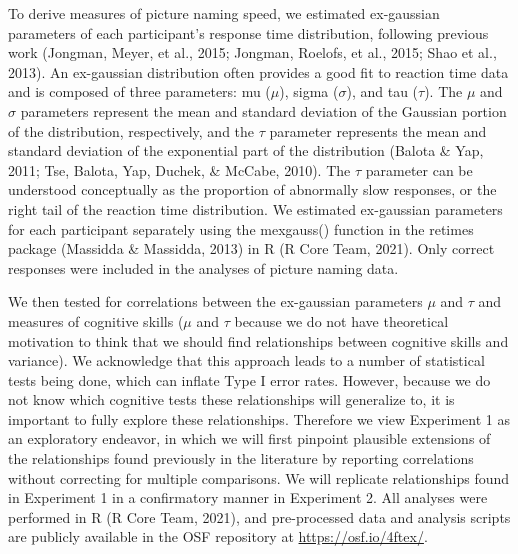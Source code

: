 \documentclass[
  man,floatsintext]{apa6}
\begin{document}
To derive measures of picture naming speed, we estimated ex-gaussian parameters of each participant's response time distribution, following previous work (Jongman, Meyer, et al., 2015; Jongman, Roelofs, et al., 2015; Shao et al., 2013). An ex-gaussian distribution often provides a good fit to reaction time data and is composed of three parameters: mu (\(\mu\)), sigma (\(\sigma\)), and tau (\(\tau\)). The \(\mu\) and \(\sigma\) parameters represent the mean and standard deviation of the Gaussian portion of the distribution, respectively, and the \(\tau\) parameter represents the mean and standard deviation of the exponential part of the distribution (Balota \& Yap, 2011; Tse, Balota, Yap, Duchek, \& McCabe, 2010). The \(\tau\) parameter can be understood conceptually as the proportion of abnormally slow responses, or the right tail of the reaction time distribution. We estimated ex-gaussian parameters for each participant separately using the mexgauss() function in the retimes package (Massidda \& Massidda, 2013) in R (R Core Team, 2021). Only correct responses were included in the analyses of picture naming data.

We then tested for correlations between the ex-gaussian parameters \(\mu\) and \(\tau\) and measures of cognitive skills (\(\mu\) and \(\tau\) because we do not have theoretical motivation to think that we should find relationships between cognitive skills and variance). We acknowledge that this approach leads to a number of statistical tests being done, which can inflate Type I error rates. However, because we do not know which cognitive tests these relationships will generalize to, it is important to fully explore these relationships. Therefore we view Experiment 1 as an exploratory endeavor, in which we will first pinpoint plausible extensions of the relationships found previously in the literature by reporting correlations without correcting for multiple comparisons. We will replicate relationships found in Experiment 1 in a confirmatory manner in Experiment 2. All analyses were performed in R (R Core Team, 2021), and pre-processed data and analysis scripts are publicly available in the OSF repository at \url{https://osf.io/4ftex/}.
\end{document}
